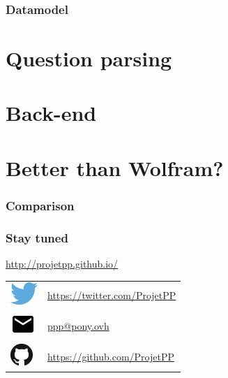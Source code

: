 \documentclass[10pt, compress]{beamer}
\begin{document}
\begin{frame}[fragile]
    \frametitle{Datamodel}
\end{frame}

\section{Question parsing}

\section{Back-end}

\section{Better than Wolfram?}

\begin{frame}[fragile]
    \frametitle{Comparison}
\end{frame}

\newlength{\logosize}
\setlength{\logosize}{12pt}
\begin{frame}[fragile]
    \frametitle{Stay tuned}
    \alert{\url{http://projetpp.github.io/}}

    \begin{tabular}{ll}
        \includegraphics[width=\logosize]{Twitter_logo_blue.png} & \href{https://twitter.com/ProjetPP}{https://twitter.com/ProjetPP}\\
        \includegraphics[width=\logosize]{ic_email_black_18dp.png} & \href{mailto:ppp@pony.ovh}{ppp@pony.ovh}\\
        \includegraphics[width=\logosize]{GitHub-Mark-32px.png} &  \href{https://github.com/ProjetPP}{https://github.com/ProjetPP}\\
    \end{tabular}
\end{frame}

\end{document}
